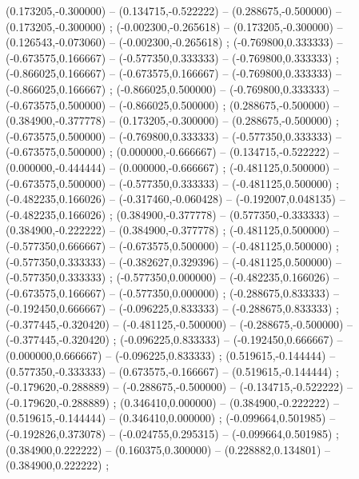    (0.173205,-0.300000) -- (0.134715,-0.522222) -- (0.288675,-0.500000) -- (0.173205,-0.300000) ;
   (-0.002300,-0.265618) -- (0.173205,-0.300000) -- (0.126543,-0.073060) -- (-0.002300,-0.265618) ;
   (-0.769800,0.333333) -- (-0.673575,0.166667) -- (-0.577350,0.333333) -- (-0.769800,0.333333) ;
   (-0.866025,0.166667) -- (-0.673575,0.166667) -- (-0.769800,0.333333) -- (-0.866025,0.166667) ;
   (-0.866025,0.500000) -- (-0.769800,0.333333) -- (-0.673575,0.500000) -- (-0.866025,0.500000) ;
   (0.288675,-0.500000) -- (0.384900,-0.377778) -- (0.173205,-0.300000) -- (0.288675,-0.500000) ;
   (-0.673575,0.500000) -- (-0.769800,0.333333) -- (-0.577350,0.333333) -- (-0.673575,0.500000) ;
   (0.000000,-0.666667) -- (0.134715,-0.522222) -- (0.000000,-0.444444) -- (0.000000,-0.666667) ;
   (-0.481125,0.500000) -- (-0.673575,0.500000) -- (-0.577350,0.333333) -- (-0.481125,0.500000) ;
   (-0.482235,0.166026) -- (-0.317460,-0.060428) -- (-0.192007,0.048135) -- (-0.482235,0.166026) ;
   (0.384900,-0.377778) -- (0.577350,-0.333333) -- (0.384900,-0.222222) -- (0.384900,-0.377778) ;
   (-0.481125,0.500000) -- (-0.577350,0.666667) -- (-0.673575,0.500000) -- (-0.481125,0.500000) ;
   (-0.577350,0.333333) -- (-0.382627,0.329396) -- (-0.481125,0.500000) -- (-0.577350,0.333333) ;
   (-0.577350,0.000000) -- (-0.482235,0.166026) -- (-0.673575,0.166667) -- (-0.577350,0.000000) ;
   (-0.288675,0.833333) -- (-0.192450,0.666667) -- (-0.096225,0.833333) -- (-0.288675,0.833333) ;
   (-0.377445,-0.320420) -- (-0.481125,-0.500000) -- (-0.288675,-0.500000) -- (-0.377445,-0.320420) ;
   (-0.096225,0.833333) -- (-0.192450,0.666667) -- (0.000000,0.666667) -- (-0.096225,0.833333) ;
   (0.519615,-0.144444) -- (0.577350,-0.333333) -- (0.673575,-0.166667) -- (0.519615,-0.144444) ;
   (-0.179620,-0.288889) -- (-0.288675,-0.500000) -- (-0.134715,-0.522222) -- (-0.179620,-0.288889) ;
   (0.346410,0.000000) -- (0.384900,-0.222222) -- (0.519615,-0.144444) -- (0.346410,0.000000) ;
   (-0.099664,0.501985) -- (-0.192826,0.373078) -- (-0.024755,0.295315) -- (-0.099664,0.501985) ;
   (0.384900,0.222222) -- (0.160375,0.300000) -- (0.228882,0.134801) -- (0.384900,0.222222) ;
